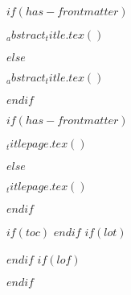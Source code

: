 $if(has-frontmatter)$
  \begin{frontmatter}
  \begin{titlepage}
  $_abstract_title.tex()$
  \end{titlepage}
  \end{frontmatter}
$else$
  \begin{titlepage}
  $_abstract_title.tex()$
  \end{titlepage}
$endif$



$if(has-frontmatter)$
  \begin{frontmatter}
  \begin{titlepage}
  $_titlepage.tex()$
  \end{titlepage}
  \end{frontmatter}
$else$
  \begin{titlepage}
  $_titlepage.tex()$
  \end{titlepage}
$endif$

%

\pagestyle{plain}
\begin{center}

\end{center}


$if(toc)$
\tableofcontents
$endif$
$if(lot)$
\listoftables
$endif$
$if(lof)$
\listoffigures
$endif$

\let\mainmatterreal\mainmatter
\let\mainmatter\relax